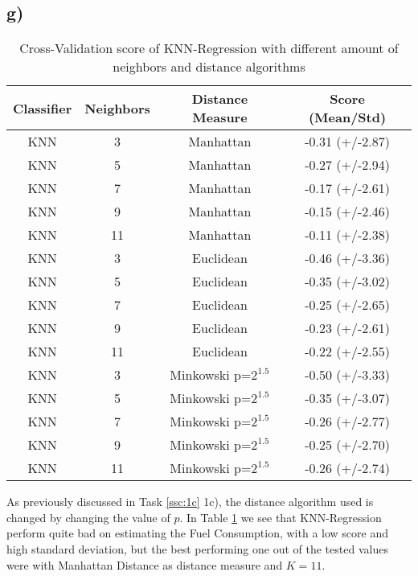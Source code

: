 \documentclass{article}
\begin{document}
        \subsection{g)}
          \begin{table}[h]
            \centering
            \label{tbl:task1g}  
            \begin{tabular}{cccc}
              \toprule
              Classifier &  Neighbors &    Distance Measure &    Score (Mean/Std)\\
              \midrule
              KNN &          3 &              Manhattan &  -0.31 (+/-2.87) \\
              KNN &          5 &              Manhattan &  -0.27 (+/-2.94) \\
              KNN &          7 &              Manhattan &  -0.17 (+/-2.61) \\
              KNN &          9 &              Manhattan &  -0.15 (+/-2.46) \\
              KNN &         11 &              Manhattan &  -0.11 (+/-2.38) \\
              KNN &          3 &              Euclidean &  -0.46 (+/-3.36) \\
              KNN &          5 &              Euclidean &  -0.35 (+/-3.02) \\
              KNN &          7 &              Euclidean &  -0.25 (+/-2.65) \\
              KNN &          9 &              Euclidean &  -0.23 (+/-2.61) \\
              KNN &         11 &              Euclidean &  -0.22 (+/-2.55) \\
              KNN &          3 &  Minkowski p=$2^{1.5}$ &  -0.50 (+/-3.33) \\
              KNN &          5 &  Minkowski p=$2^{1.5}$ &  -0.35 (+/-3.07) \\
              KNN &          7 &  Minkowski p=$2^{1.5}$ &  -0.26 (+/-2.77) \\
              KNN &          9 &  Minkowski p=$2^{1.5}$ &  -0.25 (+/-2.70) \\
              KNN &         11 &  Minkowski p=$2^{1.5}$ &  -0.26 (+/-2.74) \\
              \bottomrule
            \end{tabular}
            \caption{Cross-Validation score of KNN-Regression with different amount of neighbors and distance algorithms}
            As previously discussed in Task \ref{ssc:1c} 1c), the distance algorithm used is changed by changing the value of $p$.
            In Table \ref{tbl:task1g} we see that KNN-Regression perform quite bad on estimating the Fuel Consumption, with a low score and 
            high standard deviation, but the best performing one out of the tested values were with Manhattan Distance as distance measure and $K=11$.
          \end{table}
\end{document}
